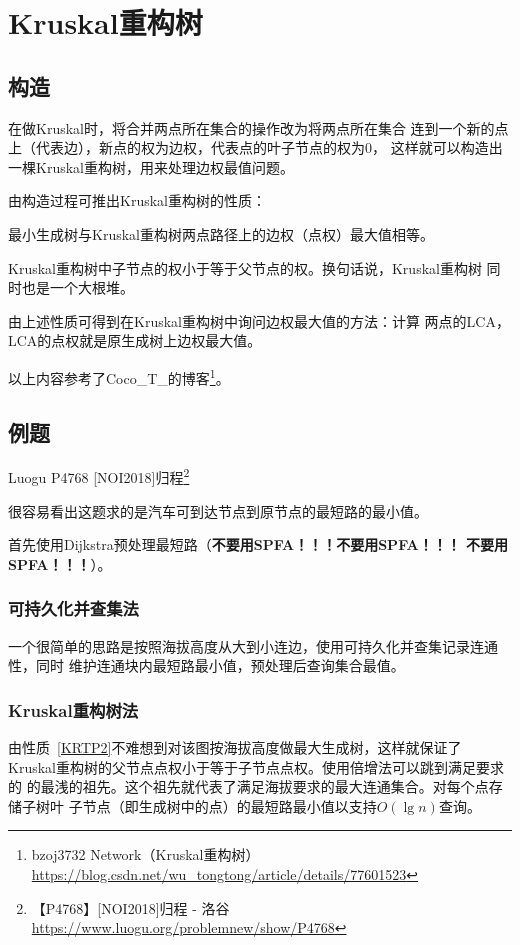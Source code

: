 \section{Kruskal重构树}
\subsection{构造}
在做Kruskal时，将合并两点所在集合的操作改为将两点所在集合
连到一个新的点上（代表边），新点的权为边权，代表点的叶子节点的权为0，
这样就可以构造出一棵Kruskal重构树，用来处理边权最值问题。

由构造过程可推出Kruskal重构树的性质：

\begin{property}
	最小生成树与Kruskal重构树两点路径上的边权（点权）最大值相等。
\end{property}
\begin{property}\label{KRTP2}
	Kruskal重构树中子节点的权小于等于父节点的权。换句话说，Kruskal重构树
	同时也是一个大根堆。
\end{property}
由上述性质可得到在Kruskal重构树中询问边权最大值的方法：计算
两点的LCA，LCA的点权就是原生成树上边权最大值。

以上内容参考了Coco\_T\_的博客\footnote{
	bzoj3732 Network（Kruskal重构树）\\
	\url{https://blog.csdn.net/wu_tongtong/article/details/77601523}
}。
\subsection{例题}
Luogu P4768 [NOI2018]归程\footnote{
【P4768】[NOI2018]归程 - 洛谷
\url{https://www.luogu.org/problemnew/show/P4768}
}

很容易看出这题求的是汽车可到达节点到原节点的最短路的最小值。

首先使用Dijkstra预处理最短路（{\bfseries 不要用SPFA！！！不要用SPFA！！！
不要用SPFA！！！}）。

\subsubsection{可持久化并查集法}
一个很简单的思路是按照海拔高度从大到小连边，使用可持久化并查集记录连通性，同时
维护连通块内最短路最小值，预处理后查询集合最值。

\subsubsection{Kruskal重构树法}
由性质~\ref{KRTP2}不难想到对该图按海拔高度做最大生成树，这样就保证了
Kruskal重构树的父节点点权小于等于子节点点权。使用倍增法可以跳到满足要求的
的最浅的祖先。这个祖先就代表了满足海拔要求的最大连通集合。对每个点存储子树叶
子节点（即生成树中的点）的最短路最小值以支持$O(\lg n)$查询。

